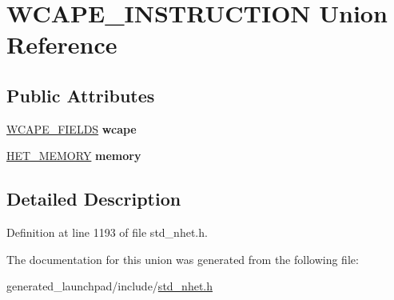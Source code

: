 \hypertarget{unionWCAPE__INSTRUCTION}{}\section{W\+C\+A\+P\+E\+\_\+\+I\+N\+S\+T\+R\+U\+C\+T\+I\+ON Union Reference}
\label{unionWCAPE__INSTRUCTION}
\subsection*{Public Attributes}
\begin{DoxyCompactItemize}
\item 
\mbox{\label{unionWCAPE__INSTRUCTION_a0724f15a8c8a936c8e51d54ed9bcd37f}} 
\mbox{\hyperlink{structwcape__format}{W\+C\+A\+P\+E\+\_\+\+F\+I\+E\+L\+DS}} {\bfseries wcape}
\item 
\mbox{\label{unionWCAPE__INSTRUCTION_a34adcb9b452793c19c6cbeabd220f229}} 
\mbox{\hyperlink{structmemory__format}{H\+E\+T\+\_\+\+M\+E\+M\+O\+RY}} {\bfseries memory}
\end{DoxyCompactItemize}


\subsection{Detailed Description}


Definition at line 1193 of file std\+\_\+nhet.\+h.



The documentation for this union was generated from the following file\+:\begin{DoxyCompactItemize}
\item 
generated\+\_\+launchpad/include/\mbox{\hyperlink{std__nhet_8h}{std\+\_\+nhet.\+h}}\end{DoxyCompactItemize}
